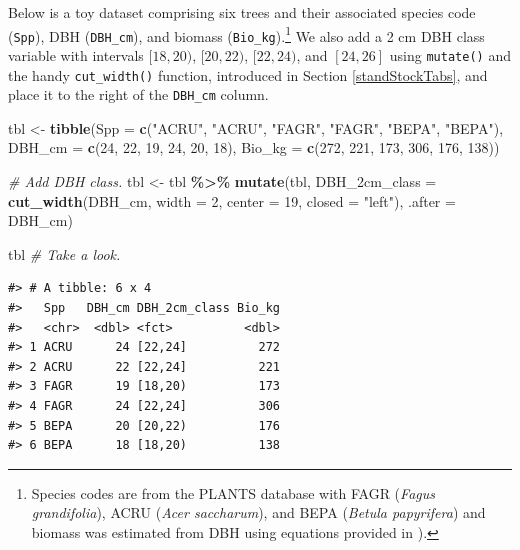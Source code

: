 \documentclass[
  11pt,
]{krantz}
\newenvironment{Shaded}{\begin{snugshade}}{\end{snugshade}}
\newcommand{\CommentTok}[1]{\textcolor[rgb]{0.56,0.35,0.01}{\textit{#1}}}
\newcommand{\DataTypeTok}[1]{\textcolor[rgb]{0.13,0.29,0.53}{#1}}
\newcommand{\DecValTok}[1]{\textcolor[rgb]{0.00,0.00,0.81}{#1}}
\newcommand{\KeywordTok}[1]{\textcolor[rgb]{0.13,0.29,0.53}{\textbf{#1}}}
\newcommand{\NormalTok}[1]{#1}
\newcommand{\OperatorTok}[1]{\textcolor[rgb]{0.81,0.36,0.00}{\textbf{#1}}}
\newcommand{\StringTok}[1]{\textcolor[rgb]{0.31,0.60,0.02}{#1}}
\theoremstyle{definition}
\theoremstyle{definition}
\theoremstyle{definition}
\theoremstyle{definition}
\theoremstyle{remark}
\begin{document}
Below is a toy dataset comprising six trees and their associated species code (\texttt{Spp}), DBH (\texttt{DBH\_cm}), and biomass (\texttt{Bio\_kg}).\footnote{Species codes are from the PLANTS database \citep{PLANTSDB} with FAGR (\emph{Fagus grandifolia}), ACRU (\emph{Acer saccharum}), and BEPA (\emph{Betula papyrifera}) and biomass was estimated from DBH using equations provided in \citet{jenkins2004}).} We also add a 2 cm DBH class variable with intervals \([18, 20)\), \([20, 22)\), \([22, 24)\), and \([24, 26]\) using \texttt{mutate()} and the handy \texttt{cut\_width()} function, introduced in Section \ref{standStockTabs}, and place it to the right of the \texttt{DBH\_cm} column.

\begin{Shaded}
\begin{Highlighting}[]
\NormalTok{tbl \textless{}{-}}\StringTok{ }\KeywordTok{tibble}\NormalTok{(}\DataTypeTok{Spp =} \KeywordTok{c}\NormalTok{(}\StringTok{"ACRU"}\NormalTok{, }\StringTok{"ACRU"}\NormalTok{, }\StringTok{"FAGR"}\NormalTok{, }\StringTok{"FAGR"}\NormalTok{, }\StringTok{"BEPA"}\NormalTok{, }\StringTok{"BEPA"}\NormalTok{),}
              \DataTypeTok{DBH\_cm =} \KeywordTok{c}\NormalTok{(}\DecValTok{24}\NormalTok{, }\DecValTok{22}\NormalTok{, }\DecValTok{19}\NormalTok{, }\DecValTok{24}\NormalTok{, }\DecValTok{20}\NormalTok{, }\DecValTok{18}\NormalTok{),}
              \DataTypeTok{Bio\_kg =} \KeywordTok{c}\NormalTok{(}\DecValTok{272}\NormalTok{, }\DecValTok{221}\NormalTok{, }\DecValTok{173}\NormalTok{, }\DecValTok{306}\NormalTok{, }\DecValTok{176}\NormalTok{, }\DecValTok{138}\NormalTok{))}

\CommentTok{\# Add DBH class.}
\NormalTok{tbl \textless{}{-}}\StringTok{ }\NormalTok{tbl }\OperatorTok{\%\textgreater{}\%}\StringTok{ }
\StringTok{  }\KeywordTok{mutate}\NormalTok{(tbl, }
         \DataTypeTok{DBH\_2cm\_class =} \KeywordTok{cut\_width}\NormalTok{(DBH\_cm, }\DataTypeTok{width =} \DecValTok{2}\NormalTok{, }
                                   \DataTypeTok{center =} \DecValTok{19}\NormalTok{, }\DataTypeTok{closed =} \StringTok{"left"}\NormalTok{), }
         \DataTypeTok{.after =}\NormalTok{ DBH\_cm)}

\NormalTok{tbl }\CommentTok{\# Take a look.}
\end{Highlighting}
\end{Shaded}

\begin{verbatim}
#> # A tibble: 6 x 4
#>   Spp   DBH_cm DBH_2cm_class Bio_kg
#>   <chr>  <dbl> <fct>          <dbl>
#> 1 ACRU      24 [22,24]          272
#> 2 ACRU      22 [22,24]          221
#> 3 FAGR      19 [18,20)          173
#> 4 FAGR      24 [22,24]          306
#> 5 BEPA      20 [20,22)          176
#> 6 BEPA      18 [18,20)          138
\end{verbatim}
\end{document}
